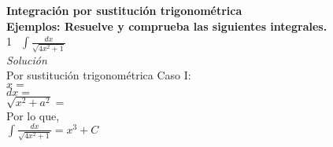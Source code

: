 \documentclass[12pt,a4paper]{article}
\begin{document}
{\bf Integración por sustitución trigonométrica}\\

{\bf Ejemplos: Resuelve y comprueba las siguientes integrales.}\\

\textcircled{1}\ $\displaystyle{\int\frac{dx}{\sqrt{4x^2+1}}}$\\

{\it Solución}\\

Por sustitución trigonométrica Caso I:\\
$x=$\\
$dx=$\\
$\sqrt{x^2+a^2}=$\\

Por lo que,\\
$\displaystyle{\int\frac{dx}{\sqrt{4x^2+1}}}=x^3+C$\\
\end{document}
